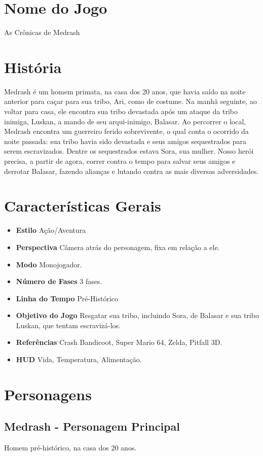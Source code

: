 \documentclass[letterpaper,11pt]{article}
\begin{document}
\section{Nome do Jogo}

As Crônicas de Medrash

\section{História}
Medrash é um homem primata, na casa dos 20 anos, que havia saído na noite anterior para caçar para sua tribo, Ari, como de costume.
Na manhã seguinte, ao voltar para casa, ele encontra sua tribo devastada após um ataque da tribo inimiga, Luskan, a mando de seu arqui-inimigo, Balasar. 
Ao percorrer o local, Medrash encontra um guerreiro ferido sobrevivente, o qual conta o ocorrido da noite passada: sua tribo havia sido devastada e seus amigos sequestrados para serem escravizados. Dentre os sequestrados estava Sora, sua mulher. Nosso herói precisa, a partir de agora, correr contra o tempo para salvar seus amigos e derrotar Balasar, fazendo alianças e lutando contra as mais diversas adversidades.

\section{Características Gerais}
\begin{itemize}
\item {\bf Estilo} Ação/Aventura
\item {\bf Perspectiva} Câmera atrás do personagem, fixa em relação a ele.
\item {\bf Modo} Monojogador.
\item {\bf Número de Fases} 3 fases.
\item {\bf Linha do Tempo} Pré-Histórico
\item {\bf Objetivo do Jogo} Resgatar sua tribo, incluindo Sora, de Balasar e sua tribo Luskan, que tentam escravizá-los.
\item {\bf Referências} Crash Bandicoot, Super Mario 64, Zelda, Pitfall 3D.
\item {\bf HUD} Vida, Temperatura, Alimentação.
\end{itemize}

\section{Personagens}

\subsection{Medrash - Personagem Principal}
Homem pré-histórico, na casa dos 20 anos.
\end{document}
